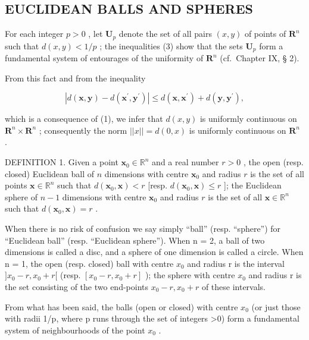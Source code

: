 \subsection{EUCLIDEAN BALLS AND SPHERES}

For each integer \(p > 0\) , let \(\mathbf{U}_p\) denote the set of all pairs \((x, y)\) of points of \(\mathbf{R}^n\) such that \(d(x, y) < 1/p\) ; the inequalities (3) show that the sets \(\mathbf{U}_p\) form a fundamental system of entourages of the uniformity of \(\mathbf{R}^n\) (cf.~Chapter IX, § 2).

From this fact and from the inequality

\[
\left| d \left(\boldsymbol {x}, \boldsymbol {y}\right) - d \left(\boldsymbol {x} ^ {\prime}, \boldsymbol {y} ^ {\prime}\right) \right| \leqslant d \left(\boldsymbol {x}, \boldsymbol {x} ^ {\prime}\right) + d \left(\boldsymbol {y}, \boldsymbol {y} ^ {\prime}\right),
\]

which is a consequence of (1), we infer that \(d(x, y)\) is uniformly continuous on \(\mathbf{R}^n \times \mathbf{R}^n\) ; consequently the norm \(||x|| = d(0, x)\) is uniformly continuous on \(\mathbf{R}^n\) .

DEFINITION 1. Given a point \(\mathbf{x}_0 \in \mathbb{R}^n\) and a real number \(r > 0\) , the open (resp. closed) Euclidean ball of \(n\) dimensions with centre \(\mathbf{x}_0\) and radius \(r\) is the set of all points \(\mathbf{x} \in \mathbb{R}^n\) such that \(d(\mathbf{x}_0, \mathbf{x}) < r\) {[}resp. \(d(\mathbf{x}_0, \mathbf{x}) \leqslant r\) {]}; the Euclidean sphere of \(n - 1\) dimensions with centre \(\mathbf{x}_0\) and radius \(r\) is the set of all \(\mathbf{x} \in \mathbb{R}^n\) such that \(d(\mathbf{x}_0, \mathbf{x}) = r\) .

When there is no risk of confusion we say simply ``ball'' (resp. ``sphere'') for ``Euclidean ball'' (resp. ``Euclidean sphere''). When n = 2, a ball of two dimensions is called a disc, and a sphere of one dimension is called a circle. When n = 1, the open (resp. closed) ball with centre \(x_{0}\) and radius r is the interval \(]x_{0} - r, x_{0} + r[\) (resp. \([x_{0} - r, x_{0} + r]\) ); the sphere with centre \(x_{0}\) and radius r is the set consisting of the two end-points \(x_{0} - r, x_{0} + r\) of these intervals.

From what has been said, the balls (open or closed) with centre \(x_{0}\) (or just those with radii 1/p, where p runs through the set of integers \textgreater0) form a fundamental system of neighbourhoods of the point \(x_{0}\) .

